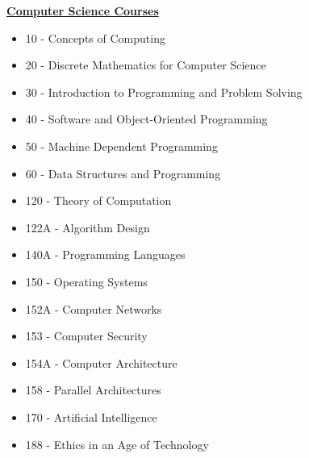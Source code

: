 \documentclass[11pt]{ltxdoc}
\begin{document}
\noindent
\textbf{\underline{Computer Science Courses}}
\begin{itemize}
  \item 10 - Concepts of Computing
  \item 20 - Discrete Mathematics for Computer Science
  \item 30 - Introduction to Programming and Problem Solving
  \item 40 - Software and Object-Oriented Programming
  \item 50 - Machine Dependent Programming
  \item 60 - Data Structures and Programming
  \item 120 - Theory of Computation
  \item 122A - Algorithm Design
  \item 140A - Programming Languages
  \item 150 - Operating Systems
  \item 152A - Computer Networks
  \item 153 - Computer Security
  \item 154A - Computer Architecture
  \item 158 - Parallel Architectures
  \item 170 - Artificial Intelligence
  \item 188 - Ethics in an Age of Technology
\end{itemize}
\end{document}
